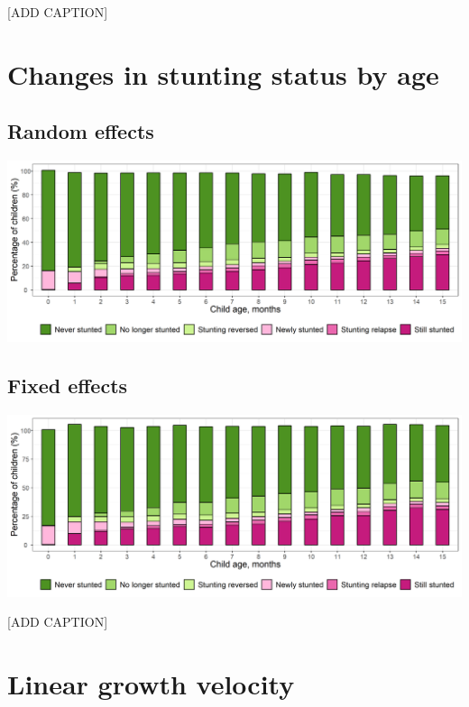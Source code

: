 \documentclass[9pt,]{book}
\begin{document}
{[}ADD CAPTION{]}

\hypertarget{changes-in-stunting-status-by-age}{%
\section{Changes in stunting status by age}\label{changes-in-stunting-status-by-age}}

\hypertarget{random-effects-2}{%
\subsection{Random effects}\label{random-effects-2}}

\includegraphics[width=41.67in]{figure-copies/fig-stunt-2-flow-overall--allage-re}

\hypertarget{fixed-effects-3}{%
\subsection{Fixed effects}\label{fixed-effects-3}}

\includegraphics[width=41.67in]{figure-copies/fig-stunt-2-flow-overall--allage-fe}

{[}ADD CAPTION{]}

\hypertarget{linear-growth-velocity}{%
\section{Linear growth velocity}\label{linear-growth-velocity}}
\end{document}
